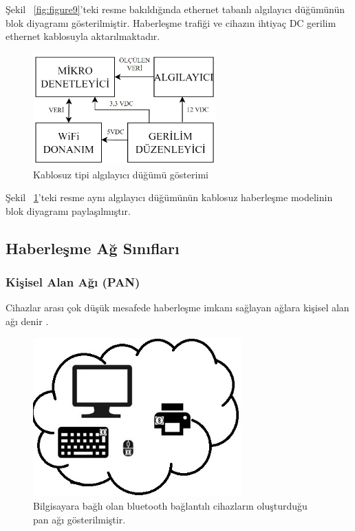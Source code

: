 Şekil ~\ref{fig:figure9}'teki resme bakıldığında ethernet tabanlı algılayıcı düğümünün blok diyagramı gösterilmiştir. Haberleşme trafiği ve cihazın ihtiyaç DC gerilim ethernet kablosuyla aktarılmaktadır.


\begin{figure}[htbp]
\centerline{\includegraphics[width=7cm]{Resim/sekil3-4.jpg}}
\caption{Kablosuz tipi algılayıcı düğümü gösterimi}
\label{fig:figure10}
\end{figure}

Şekil ~\ref{fig:figure10}'teki resme aynı algılayıcı düğümünün kablosuz haberleşme modelinin blok diyagramı paylaşılmıştır.

\subsection{Haberleşme Ağ Sınıfları}


\subsubsection{Kişisel Alan Ağı (PAN)}
Cihazlar arası çok düşük mesafede haberleşme imkanı sağlayan ağlara kişisel alan ağı denir \cite{tanenbaum2002computer}.

\begin{figure}[htbp]
\centerline{\includegraphics[width=8cm]{Resim/Sekil3-5.jpg}}
\caption{Bilgisayara bağlı olan bluetooth bağlantılı cihazların oluşturduğu \gls{pan} ağı gösterilmiştir.}
\label{fig:figure11}
\end{figure}

